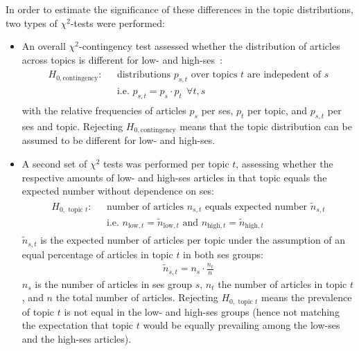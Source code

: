 In order to estimate the significance of these differences in the topic distributions, two types of $\chi^2$-tests were performed:
\begin{itemize}
    \item An overall $\chi^2$-contingency test assessed whether the distribution of articles across topics is different for low- and high-\gls{ses}~\autocite[p. 430]{fahrmeir_spezielle_2016}:
    \begin{align}
        \begin{split}\label{eq:h0_contingency}
            H_{0, \text{contingency}}: ~~~ &\text{distributions } p_{s, t} \text{ over topics } t \text{ are indepedent of } s\\
        & \text{i.e. } p_{s, t} = p_s \cdot p_t ~~ \forall t, s
        \end{split}
    \end{align}
    with the relative frequencies of articles $p_s$ per \gls{ses}, $p_t$ per topic, and $p_{s, t}$ per \gls{ses} and topic. Rejecting $H_{0, \text{contingency}}$ means that the topic distribution can be assumed to be different for low- and high-\gls{ses}.

    \item A second set of $\chi^2$ tests was performed per topic $t$, assessing whether the respective amounts of low- and high-\gls{ses} articles in that topic equals the expected number without dependence on \gls{ses}:
    \begin{align}
        \begin{split}\label{eq:h0_topic}
            H_{0, \text{ topic }t}: ~~~ &\text{number of articles } n_{s, t} \text{ equals expected number } \tilde n_{s, t} \\
            & \text{i.e. } n_{\text{low}, t} = \tilde n_{\text{low}, t} \text{ and } n_{\text{high}, t} = \tilde n_{\text{high}, t}
        \end{split}
    \end{align}
    $\tilde n_{s, t}$ is the expected number of articles per topic under the assumption of an equal percentage of articles in topic $t$ in both \gls{ses} groups:
    \begin{align}
        \tilde n_{s, t} = n_s \cdot \frac{n_t}{n}
    \end{align}
    $n_s$ is the number of articles in \gls{ses} group $s$, $n_t$ the number of articles in topic $t$, and $n$ the total number of articles. Rejecting $H_{0, \text{ topic }t}$ means the prevalence of topic $t$ is not equal in the low- and high-\gls{ses} groups (hence not matching the expectation that topic $t$ would be equally prevailing among the low-\gls{ses} and the high-\gls{ses} articles).
\end{itemize}

